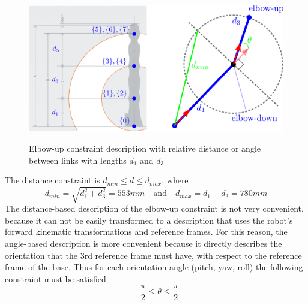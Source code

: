 \begin{center}
\begin{figure}[!htb]
\centering
\includegraphics[width=\textwidth]{images/elbow-up-constraint-geometry.png}\\
\caption{Elbow-up constraint description with relative distance or angle between links with lengths $d_1$ and $d_3$}
\label{elbow-up-constraint-geometry}
\end{figure}
\end{center}

The distance constraint is $d_{min} \leq d \leq d_{max} $, where
\[
d_{min} = \sqrt{d_1^2 + d_3^2} = 553mm  \quad \textrm{and} \quad  d_{max} = d_1 + d_3 = 780mm
\]
The distance-based description of the elbow-up constraint is not very convenient, because it can not be easily transformed to a description that uses the robot's forward kinematic transformations and reference frames. 
For this reason, the angle-based description is more convenient because it directly describes the orientation that the 3rd reference frame must have, with respect to the reference frame of the base. Thus for each orientation 
angle (pitch, yaw, roll) the following constraint must be satisfied
\[
-\frac{\pi}{2} \leq θ \leq \frac{\pi}{2}
\]
